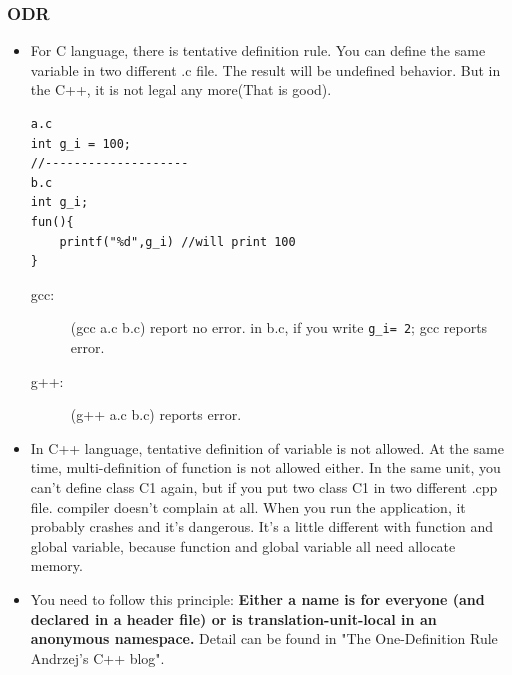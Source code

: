 \documentclass[a4paper,11pt,twoside]{book}
\begin{document}
\subsubsection{ODR}
\begin{itemize}
	\item For C language, there is tentative definition rule. You can define the same variable in two different .c file. The result will be undefined behavior. But in the C++, it is not legal any more(That is good). 
	
\begin{lstlisting}[numbers=none]
a.c
int g_i = 100;
//--------------------
b.c
int g_i;
fun(){
	printf("%d",g_i) //will print 100
}
\end{lstlisting}
	\begin{description}
		\item[gcc:] (gcc a.c b.c) report no error. in b.c, if you write \texttt{g\_i= 2}; gcc reports error.
		\item[g++:] (g++ a.c b.c) reports error.
	\end{description}

	\item In C++ language, tentative definition of variable is not allowed. At the same time, multi-definition of function is not allowed either. In the same unit, you can't define class C1 again, but if you put two class C1 in two different .cpp file. compiler doesn't complain at all. When you run the application, it probably crashes and it's dangerous. It's a little different with function and global variable, because function and global variable all need allocate memory.
	
	\item You need to follow this principle: \textbf{Either a name is for everyone (and declared in a header file) or is translation-unit-local in an anonymous namespace.} Detail can be found in "The One-Definition Rule  Andrzej's C++ blog".
\end{itemize}
\end{document}
